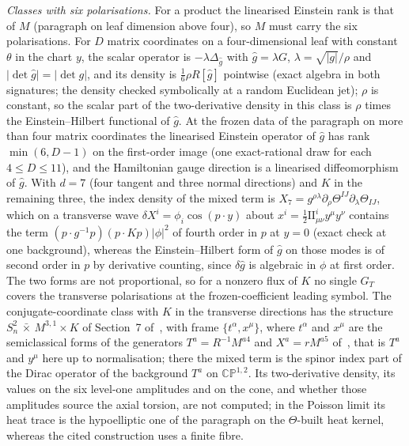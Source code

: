 \emph{Classes with six polarisations.} For a product the linearised Einstein rank is that of \(M\) (paragraph on leaf dimension above four), so \(M\) must carry the six polarisations. For \(D\) matrix coordinates on a four-dimensional leaf with constant \(\theta\) in the chart \(y\), the scalar operator is \(-\lambda\Delta_{\hat g}\) with \(\hat g=\lambda G\), \(\lambda=\sqrt{\lvert g\rvert}/\rho\) and \(\lvert\det\hat g\rvert=\lvert\det g\rvert\), and its density is \(\tfrac16\rho R[\hat g]\) pointwise (exact algebra in both signatures; the density checked symbolically at a random Euclidean jet); \(\rho\) is constant, so the scalar part of the two-derivative density in this class is \(\rho\) times the Einstein--Hilbert functional of \(\hat g\). At the frozen data of the paragraph on more than four matrix coordinates the linearised Einstein operator of \(\hat g\) has rank \(\min(6,D-1)\) on the first-order image (one exact-rational draw for each \(4\le D\le11\)), and the Hamiltonian gauge direction is a linearised diffeomorphism of \(\hat g\). With \(d=7\) (four tangent and three normal directions) and \(K\) in the remaining three, the index density of the mixed term is \(X_7=g^{\rho\lambda}\partial_\rho\Theta^{IJ}\partial_\lambda\Theta_{IJ}\), which on a transverse wave \(\delta X^i=\phi_i\cos(p\cdot y)\) about \(x^i=\tfrac12\mathrm{II}^i_{\mu\nu}y^\mu y^\nu\) contains the term \((p\cdot g^{-1}p)(p\cdot Kp)\lvert\phi\rvert^2\) of fourth order in \(p\) at \(y=0\) (exact check at one background), whereas the Einstein--Hilbert form of \(\hat g\) on those modes is of second order in \(p\) by derivative counting, since \(\delta\hat g\) is algebraic in \(\phi\) at first order. The two forms are not proportional, so for a nonzero flux of \(K\) no single \(G_T\) covers the transverse polarisations at the frozen-coefficient leading symbol. The conjugate-coordinate class with \(K\) in the transverse directions has the structure \(S^2_n\,\bar\times\,M^{3,1}\times K\) of Section~7 of~\cite{Steinacker2023}, with frame \(\{t^\alpha,x^\mu\}\), where \(t^\alpha\) and \(x^\mu\) are the semiclassical forms of the generators \(T^a=R^{-1}M^{a4}\) and \(X^a=rM^{a5}\) of~\cite{SperlingSteinacker2019}, that is \(T^a\) and \(y^\mu\) here up to normalisation; there the mixed term is the spinor index part of the Dirac operator of the background \(T^a\) on \(\mathbb{CP}^{1,2}\). Its two-derivative density, its values on the six level-one amplitudes and on the cone, and whether those amplitudes source the axial torsion, are not computed; in the Poisson limit its heat trace is the hypoelliptic one of the paragraph on the \(\Theta\)-built heat kernel, whereas the cited construction uses a finite fibre.

